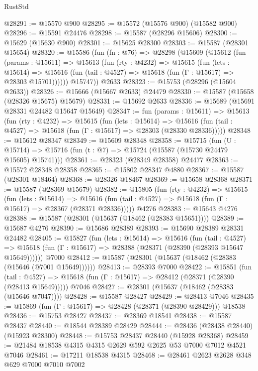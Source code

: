 \begin{lexlean}{RustStd}
\begin{coremodule}
@28291 := @15570 @900
@28295 := @15572 (@15576 @900) (@15582 @900)
@28296 := @15591 @24476
@28298 := @15587 (@28296 @15606)
@28300 := @15629 (@15630 @900)
@28301 := @15625 @28300
@28303 := @15587 (@28301 @15654)
@28320 := @15586
    (fun (fn : @76) =>
    @28298
      (@15609
        (@15612
          (fun (params : @15611) =>
          @15613
            (fun (rty : @4232) =>
            @15615
              (fun (lets : @15614) =>
              @15616 (fun (tail : @4527) => @15618 (fun (Γ : @15617) => @28303 @15701))))))
        @15747))
    @2633
@28323 := @15753 (@28296 (@15604 @2633))
@28326 := @15666 (@15667 @2633) @24479
@28330 := @15587 (@15658 (@28326 @15675) @15679)
@28331 := @15692 @2633
@28336 := @15689 (@15691 @28331 @24482 @15647 @15649)
@28347 := fun (params : @15611) =>
  @15613
    (fun (rty : @4232) =>
    @15615
      (fun (lets : @15614) =>
      @15616 (fun (tail : @4527) => @15618 (fun (Γ : @15617) => @28303 (@28330 @28336)))))
@28348 := @15612 @28347
@28349 := @15609 @28348
@28358 := @15715
    (fun (U : @15714) => @15716 (fun (t : @7) => @15724 (@15587 (@15730 @24479 @15605) @15741)))
@28361 := @28323 (@28349 @28358) @24477
@28363 := @15572 @28348 @28358
@28365 := @15802 @28347 @4880
@28367 := @15587 (@28301 @18464)
@28368 := @28326 @18467
@28369 := @15658 @28368
@28371 := @15587 (@28369 @15679)
@28382 := @15805
    (fun (rty : @4232) =>
    @15615
      (fun (lets : @15614) =>
      @15616 (fun (tail : @4527) => @15618 (fun (Γ : @15617) => @28367 (@28371 @28336)))))
    @4276
@28383 := @15643 @4276
@28388 := @15587 (@28301 (@15637 (@18462 (@28383 @15651))))
@28389 := @15687 @4276
@28390 := @15686 @28389
@28393 := @15690 @28389 @28331 @24482
@28405 := @15827
    (fun (lets : @15614) =>
    @15616
      (fun (tail : @4527) =>
      @15618 (fun (Γ : @15617) => @28388 (@28371 (@28390 (@28393 @15647 @15649))))))
    @7000
@28412 := @15587 (@28301 (@15637 (@18462 (@28383 (@15646 (@7001 @15649))))))
@28413 := @28393 @7000
@28422 := @15851
    (fun (tail : @4527) => @15618 (fun (Γ : @15617) => @28412 (@28371 (@28390 (@28413 @15649)))))
    @7046
@28427 := @28301 (@15637 (@18462 (@28383 (@15646 @7047))))
@28428 := @15587 @28427
@28429 := @28413 @7046
@28435 := @15869 (fun (Γ : @15617) => @28428 (@28371 (@28390 @28429))) @18538
@28436 := @15753 @28427
@28437 := @28369 @18541
@28438 := @15587 @28437
@28440 := @18544 @28389 @28429
@28444 := @28436 (@28438 @28440) (@15923 @28300)
@28448 := @15753 @28437 @28440 (@15928 @28368)
@28459 := @21484 @18538 @4315 @4315 @2629 @592 @2625 @53 @7000 @7012 @4521 @7046
@28461 := @17211 @18538 @4315
@28468 := @28461 @2623 @2628 @348 @629 @7000 @7010 @7002

\end{coremodule}
\end{lexlean}
